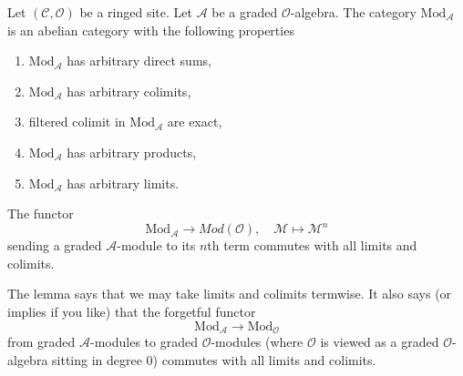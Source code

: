 \begin{lemma}
\label{lemma-gm-abelian}
Let $(\mathcal{C}, \mathcal{O})$ be a ringed site.
Let $\mathcal{A}$ be a graded $\mathcal{O}$-algebra.
The category $\text{Mod}_\mathcal{A}$ is an abelian category
with the following properties
\begin{enumerate}
\item $\text{Mod}_\mathcal{A}$ has arbitrary direct sums,
\item $\text{Mod}_\mathcal{A}$ has arbitrary colimits,
\item filtered colimit in $\text{Mod}_\mathcal{A}$ are exact,
\item $\text{Mod}_\mathcal{A}$ has arbitrary products,
\item $\text{Mod}_\mathcal{A}$ has arbitrary limits.
\end{enumerate}
The functor
$$
\text{Mod}_\mathcal{A} \longrightarrow \textit{Mod}(\mathcal{O}),\quad
\mathcal{M} \longmapsto \mathcal{M}^n
$$
sending a graded $\mathcal{A}$-module to its $n$th term commutes
with all limits and colimits.
\end{lemma}

\noindent
The lemma says that we may take limits and colimits termwise. It
also says (or implies if you like) that the forgetful functor
$$
\text{Mod}_\mathcal{A}
\longrightarrow
\text{Mod}_\mathcal{O}
$$
from graded $\mathcal{A}$-modules to graded $\mathcal{O}$-modules
(where $\mathcal{O}$ is viewed as a graded $\mathcal{O}$-algebra
sitting in degree $0$) commutes with all limits and colimits.

